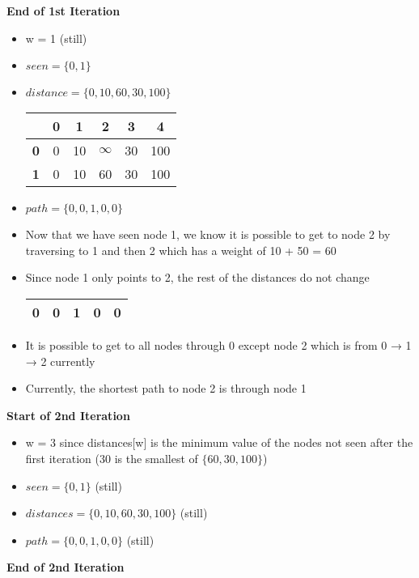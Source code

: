 \documentclass[10pt, 
a4paper, 
oneside, 
headinclude, footinclude, 
BCOR5mm]
{scrartcl}
\begin{document}
\textbf{End of 1st Iteration}
\begin{itemize}
    \item w = 1 (still)
    \item $seen = \{0,1\}$
    \item $distance = \{0,10,60,30,100\}$ 
    \begin{center}
        \begin{tabular}{|c|c|c|c|c|c|}
            \hline
            & \textbf{0} & \textbf{1} & \textbf{2} & \textbf{3} & \textbf{4} \\
            \hline
            \textbf{0} & 0 & 10 & $\infty$ & 30 & 100 \\
            \hline
            \textbf{1} & 0 & 10 & 60 & 30 & 100 \\
            \hline
        \end{tabular}
    \end{center}
    \item $path = \{0,0,1,0,0\}$
    \item Now that we have seen node 1, we know it is possible to get to node 2 by traversing to 1 and then 2 which
    has a weight of 10 + 50 = 60
    \item Since node 1 only points to 2, the rest of the distances do not change
    \begin{center}
        \begin{tabular}{|c|c|c|c|c|}
            \hline
            0 & 0 & 1 & 0 & 0 \\
            \hline
        \end{tabular}
    \end{center}
    \item It is possible to get to all nodes through 0 except node 2 which is from 0 → 1 → 2 currently
    \item Currently, the shortest path to node 2 is through node 1
\end{itemize}
\textbf{Start of 2nd Iteration}
\begin{itemize}
    \item w = 3 since distances[w] is the minimum value of the nodes not seen after the first iteration (30 is the smallest
    of $\{60, 30, 100\}$)
    \item $seen = \{0, 1\}$ (still)
    \item $distances = \{0, 10, 60, 30, 100\}$ (still)
    \item $path = \{0, 0, 1, 0, 0\}$ (still)
\end{itemize}
\textbf{End of 2nd Iteration}
\end{document}
